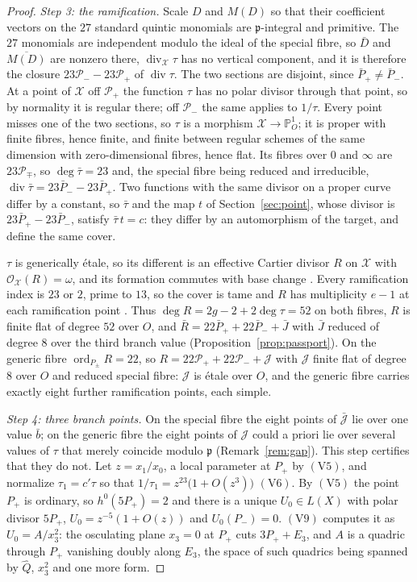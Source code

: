 \documentclass[11pt]{amsart}
\newcommand{\PP}{\mathbb{P}}
\newcommand{\pp}{\mathfrak p}
\newcommand{\Xs}{\mathscr X}
\theoremstyle{plain}
\theoremstyle{definition}
\begin{document}
\begin{proof}
\emph{Step 3: the ramification.} Scale $D$ and $M(D)$ so that their
coefficient vectors on the $27$ standard quintic monomials are
$\pp$-integral and primitive. The $27$ monomials are independent
modulo the ideal of the special fibre, so $\bar D$ and
$\overline{M(D)}$ are nonzero there, $\operatorname{div}_{\Xs}\tau$
has no vertical component, and it is therefore the closure
$23\mathcal P_--23\mathcal P_+$ of $\operatorname{div}\tau$. The two
sections are disjoint, since $\bar P_+\ne\bar P_-$. At a point of
$\Xs$ off $\mathcal P_+$ the function $\tau$ has no polar divisor
through that point, so by normality it is regular there; off
$\mathcal P_-$ the same applies to $1/\tau$. Every point misses one of
the two sections, so $\tau$ is a morphism $\Xs\to\PP^1_O$; it is
proper with finite fibres, hence finite, and finite between regular
schemes of the same dimension with zero-dimensional fibres, hence
flat.
Its fibres over $0$ and $\infty$ are $23\mathcal P_\mp$, so
$\deg\bar\tau=23$ and, the special fibre being reduced and
irreducible, $\operatorname{div}\bar\tau=23\bar P_--23\bar P_+$. Two
functions with the same divisor on a proper curve differ by a
constant, so $\bar\tau$ and the map $t$ of Section~\ref{sec:point},
whose divisor is $23\bar P_+-23\bar P_-$, satisfy $\bar\tau\, t=c$:
they differ by an automorphism of the target, and define the same
cover.

$\tau$ is generically \'etale, so its different is an effective
Cartier divisor $R$ on $\Xs$ with $\mathcal O_{\Xs}(R)=\omega$, and
its formation commutes with base change \cite[Tags 0BWA, 0BW7]{Stacks}.
Every ramification index is $23$ or $2$, prime to $13$, so the cover
is tame and $R$ has multiplicity $e-1$ at each ramification point
\cite[Ch.~III, \S6]{Serre}. Thus $\deg R=2g-2+2\deg\tau=52$ on both
fibres, $R$ is finite flat of degree $52$ over $O$, and
$\bar R=22\bar P_++22\bar P_-+\bar J$ with $\bar J$ reduced of degree
$8$ over the third branch value (Proposition~\ref{prop:passport}).
On the generic fibre $\operatorname{ord}_{P_\pm}R=22$, so
$R=22\mathcal P_++22\mathcal P_-+\mathcal J$ with $\mathcal J$ finite
flat of degree $8$ over $O$ and reduced special fibre: $\mathcal J$ is
\'etale over $O$, and the generic fibre carries exactly eight further
ramification points, each simple.

\emph{Step 4: three branch points.} On the special fibre the eight
points of $\bar{\mathcal J}$ lie over one value $\bar b$; on the
generic fibre the eight points of $\mathcal J$ could a priori lie over
several values of $\tau$ that merely coincide modulo $\pp$
(Remark~\ref{rem:gap}). This step certifies that they do not. Let
$z=x_1/x_0$, a local parameter at $P_+$ by $(\mathrm V5)$, and
normalize $\tau_1=c'\tau$ so that $1/\tau_1=z^{23}\bigl(1+O(z^3)\bigr)$
$(\mathrm V6)$. By $(\mathrm V5)$ the point $P_+$ is ordinary, so
$h^0(5P_+)=2$ and there is a unique $U_0\in L(X)$ with polar divisor
$5P_+$, $U_0=z^{-5}(1+O(z))$ and $U_0(P_-)=0$. $(\mathrm V9)$ computes
it as $U_0=A/x_3^2$: the osculating plane $x_3=0$ at $P_+$ cuts
$3P_++E_3$, and $A$ is a quadric through $P_+$ vanishing doubly along
$E_3$, the space of such quadrics being spanned by $\hat Q$, $x_3^2$
and one more form.


\end{proof}
\end{document}
